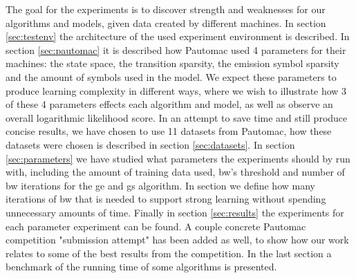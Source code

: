 The goal for the experiments is to discover strength and weaknesses for our algorithms and models, given data created by different machines. In section \ref{sec:testenv} the architecture of the used experiment environment is described. In section \ref{sec:pautomac} it is described how Pautomac used 4 parameters for their machines: the state space, the transition sparsity, the emission symbol sparsity and the amount of symbols used in the model. We expect these parameters to produce learning complexity in different ways, where we wish to illustrate how 3 of these 4 parameters effects each algorithm and model, as well as observe an overall logarithmic likelihood score. In an attempt to save time and still produce concise results, we have chosen to use 11 datasets from Pautomac, how these datasets were chosen is described in section \ref{sec:datasets}. In section \ref{sec:parameters} we have studied what parameters the experiments should by run with, including the amount of training data used, \gls{bw}'s threshold and number of \gls{bw} iterations for the \gls{ge} and \gls{gs} algorithm. In section  we define how many iterations of \gls{bw} that is needed to support strong learning without spending unnecessary amounts of time.
Finally in section \ref{sec:results} the experiments for each parameter experiment can be found. A couple concrete Pautomac competition "submission attempt" has been added as well, to show how our work relates to some of the best results from the competition. In the last section a benchmark of the running time of some algorithms is presented.